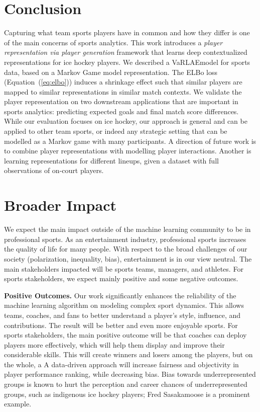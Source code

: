 \documentclass{article}
\newcommand{\system}{VaRLAE\;}
\begin{document}
\section{Conclusion}
Capturing what team sports players have in common and how they differ is one of the main concerns of sports analytics. This work introduces a {\it player representation via player generation} framework that learns deep contextualized representations for ice hockey players. We described a \system model for sports data, based on a Markov Game model representation. The ELBo loss (Equation~(\ref{eq:elbo})) induces a shrinkage effect such that similar players are mapped to similar representations in similar match contexts. We validate the player representation on two downstream applications that are important in sports analytics: predicting expected goals and final match score differences. While our evaluation focuses on ice hockey, our approach is general and can be applied to other team sports, or indeed any strategic setting that can be modelled as a Markov game with many participants. A direction of future work is to combine player representations with modelling player interactions. Another is learning representations for different lineups, given a dataset with  full observations of on-court players.

\section{Broader Impact}
We expect the main impact outside of the machine learning community to be in professional sports. As an entertainment industry, professional sports increases the quality of life for many people. With respect to the broad challenges of our society (polarization, inequality, bias), entertainment is in our view neutral. %
The main stakeholders impacted will be sports teams, managers, and athletes.  For sports stakeholders, we expect mainly positive and some negative outcomes. 

{\bf Positive Outcomes.} Our work significantly enhances the reliability of the machine learning algorithm on modeling complex sport dynamics. This allows teams, coaches, and fans to better understand a player's style, influence, and contributions. The result will be better and even more enjoyable sports. 
For sports stakeholders, the main positive outcome will be that coaches can deploy players more effectively, which will help them display and improve their considerable skills. This will create winners and losers among the players, but on the whole, a A data-driven approach will increase fairness and objectivity in player performance ranking, while decreasing bias. Bias towards underrepresented groups is known to hurt the perception and career chances of underrepresented groups, such as indigenous ice hockey players; Fred Sasakamoose is a prominent example.  
\end{document}
